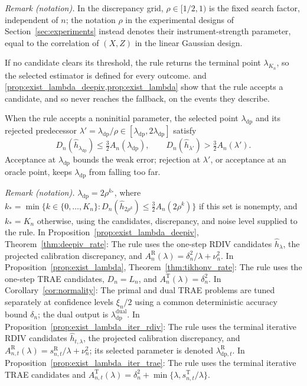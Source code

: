 \documentclass[12pt]{article}
\theoremstyle{plain}
\theoremstyle{definition}
\theoremstyle{remark}
\begin{document}
\noindent\textit{Remark (notation).} In the discrepancy grid, $\rho\in[1/2,1)$ is the fixed search factor, independent of $n$; the notation $\rho$ in the experimental designs of Section~\ref{sec:experiments} instead denotes their instrument-strength parameter, equal to the correlation of $(X,Z)$ in the linear Gaussian design.


If no candidate clears its threshold, the rule returns the terminal point $\lambda_{K_n}$, so the selected estimator is defined for every outcome.  and \cref{prop:exist_lambda_deepiv,prop:exist_lambda} show that the rule accepts a candidate, and so never reaches the fallback, on the events they describe.

When the rule accepts a noninitial parameter, the selected point $\lambda_{\mathrm{dp}}$ and its rejected predecessor $\lambda'=\lambda_{\mathrm{dp}}/\rho\in[\lambda_{\mathrm{dp}},2\lambda_{\mathrm{dp}}]$ satisfy
\begin{equation}\label{eq:discrepancy_principle}
D_n(\hat h_{\lambda_{\mathrm{dp}}})\leqslant\tfrac32A_n(\lambda_{\mathrm{dp}}),
\qquad
D_n(\hat h_{\lambda'})>\tfrac32A_n(\lambda').
\end{equation}
Acceptance at $\lambda_{\mathrm{dp}}$ bounds the weak error; rejection at $\lambda'$, or acceptance at an oracle point, keeps $\lambda_{\mathrm{dp}}$ from falling too far.

\noindent\textit{Remark (notation).} $\lambda_{\mathrm{dp}}=2\rho^{k_*}$, where $k_*=\min\{k\in\{0,\ldots,K_n\}:D_n(\hat h_{2\rho^k})\leqslant\tfrac32A_n(2\rho^k)\}$ if this set is nonempty, and $k_*=K_n$ otherwise, using the candidates, discrepancy, and noise level supplied to the rule. In Proposition~\ref{prop:exist_lambda_deepiv}, Theorem~\ref{thm:deepiv_rate}: The rule uses the one-step RDIV candidates $\hat h_\lambda$, the projected calibration discrepancy, and $A_n^{\mathrm R}(\lambda)=\delta_n^2/\lambda+\nu_n^2$. In Proposition~\ref{prop:exist_lambda}, Theorem~\ref{thm:tikhonv_rate}: The rule uses the one-step TRAE candidates, $D_n=L_n$, and $A_n^{\mathrm T}(\lambda)=\delta_n^2$. In Corollary~\ref{cor:normality}: The primal and dual TRAE problems are tuned separately at confidence levels $\xi_n/2$ using a common deterministic accuracy bound $\delta_n$; the dual output is $\lambda_{\mathrm{dp}}^{\text{dual}}$. In Proposition~\ref{prop:exist_lambda_iter_rdiv}: The rule uses the terminal iterative RDIV candidates $\hat h_{t,\lambda}$, the projected calibration discrepancy, and $A_{n,t}^{\mathrm R}(\lambda)=s_{n,t}^{\mathrm R}/\lambda+\nu_n^2$; its selected parameter is denoted $\lambda_{\mathrm{dp},t}^{\mathrm R}$. In Proposition~\ref{prop:exist_lambda_iter_trae}: The rule uses the terminal iterative TRAE candidates and $A_{n,t}^{\mathrm T}(\lambda)=\delta_n^2+\min\{\lambda,s_{n,t}^{\mathrm T}/\lambda\}$.
\end{document}
